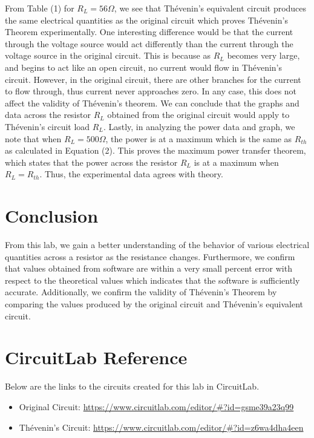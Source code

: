 \documentclass[12pt]{article}
\begin{document}
From Table (1) for $R_L = 56\Omega$, we see that Thévenin's equivalent circuit produces the same electrical quantities as the original circuit which proves Thévenin's Theorem experimentally. One interesting difference would be that the current through the voltage source would act differently than the current through the voltage source in the original circuit. This is because as $R_L$ becomes very large, and begins to act like an open circuit, no current would flow in Thévenin's circuit. However, in the original circuit, there are other branches for the current to flow through, thus current never approaches zero. In any case, this does not affect the validity of Thévenin's theorem. We can conclude that the graphs and data across the resistor $R_L$ obtained from the original circuit would apply to Thévenin's circuit load $R_L$. Lastly, in analyzing the power data and graph, we note that when $R_L = 500\Omega$, the power is at a maximum which is the same as $R_{th}$ as calculated in Equation (2). This proves the maximum power transfer theorem, which states that the power across the resistor $R_L$ is at a maximum when $R_L = R_{th}$. Thus, the experimental data agrees with theory.

\section{Conclusion}
From this lab, we gain a better understanding of the behavior of various electrical quantities across a resistor as the resistance changes. Furthermore, we confirm that values obtained from software are within a very small percent error with respect to the theoretical values which indicates that the software is sufficiently accurate. Additionally, we confirm the validity of Thévenin's Theorem by comparing the values produced by the original circuit and Thévenin's equivalent circuit.

\pagebreak

\section{CircuitLab Reference}
Below are the links to the circuits created for this lab in CircuitLab.

\begin{itemize}
    \item Original Circuit: \url{https://www.circuitlab.com/editor/#?id=gsme39a23q99}
    \item Thévenin's Circuit: \url{https://www.circuitlab.com/editor/#?id=z6wa4dha4een}
  \end{itemize}
\end{document}
